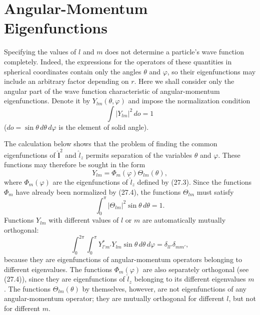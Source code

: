 \section{Angular-Momentum Eigenfunctions}

Specifying the values of $l$ and $m$ does not determine a particle's wave
function completely. Indeed, the expressions for the operators of these
quantities in spherical coordinates contain only the angles $\theta$ and
$\varphi$, so their eigenfunctions may include an arbitrary factor depending
on $r$. Here we shall consider only the angular part of the wave function
characteristic of angular-momentum eigenfunctions. Denote it by
$Y_{lm}(\theta,\varphi)$ and impose the normalization condition
\[
  \int |Y_{lm}|^2\,do=1
\]
($do=\sin\theta\,d\theta\,d\varphi$ is the element of solid angle).

The calculation below shows that the problem of finding the common
eigenfunctions of $\hat{\mathbf l}^2$ and $\hat l_z$ permits separation of
the variables $\theta$ and $\varphi$. These functions may therefore be
sought in the form
\begin{equation}
  Y_{lm}=\Phi_m(\varphi)\Theta_{lm}(\theta),
  \tag{28.1}
\end{equation}
where $\Phi_m(\varphi)$ are the eigenfunctions of $\hat l_z$ defined by
(27.3). Since the functions $\Phi_m$ have already been normalized by (27.4),
the functions $\Theta_{lm}$ must satisfy
\begin{equation}
  \int_0^\pi |\Theta_{lm}|^2\sin\theta\,d\theta=1.
  \tag{28.2}
\end{equation}
Functions $Y_{lm}$ with different values of $l$ or $m$ are automatically
mutually orthogonal:
\begin{equation}
  \int_0^{2\pi}\!\int_0^\pi
  Y_{l'm'}^*Y_{lm}\sin\theta\,d\theta\,d\varphi
  =\delta_{ll'}\delta_{mm'},
  \tag{28.3}
\end{equation}
because they are eigenfunctions of angular-momentum operators belonging to
different eigenvalues. The functions $\Phi_m(\varphi)$ are also separately
orthogonal (see (27.4)), since they are eigenfunctions of $\hat l_z$
belonging to its different eigenvalues $m$. The functions
$\Theta_{lm}(\theta)$ by themselves, however, are not eigenfunctions of any
angular-momentum operator; they are mutually orthogonal for different $l$,
but not for different $m$.

